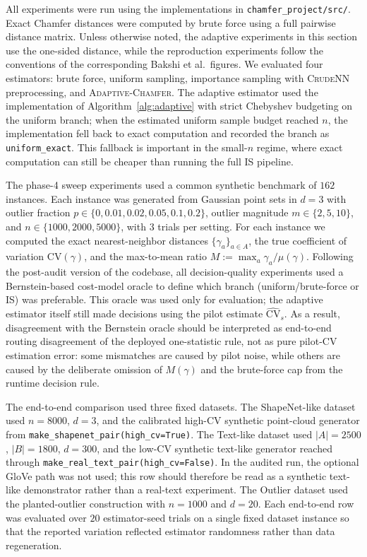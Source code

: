 \documentclass[conference]{IEEEtran}
\begin{document}
All experiments were run using the implementations in
\texttt{chamfer\_project/src/}. Exact Chamfer distances were computed
by brute force using a full pairwise distance matrix. Unless otherwise
noted, the adaptive experiments in this section use the one-sided
distance, while the reproduction experiments follow the conventions of
the corresponding Bakshi et al.\ figures. We
evaluated four estimators: brute force, uniform sampling, importance
sampling with \textsc{CrudeNN} preprocessing, and
\textsc{Adaptive-Chamfer}. The adaptive estimator used the
implementation of Algorithm~\ref{alg:adaptive} with strict Chebyshev
budgeting on the uniform branch; when the estimated uniform sample
budget reached $n$, the implementation fell back to exact computation
and recorded the branch as \texttt{uniform\_exact}. This fallback is
important in the small-$n$ regime, where exact computation can still be
cheaper than running the full IS pipeline.

The phase-4 sweep experiments used a common synthetic benchmark of
$162$ instances. Each instance was generated from Gaussian point sets in
$d=3$ with outlier fraction
$p \in \{0, 0.01, 0.02, 0.05, 0.1, 0.2\}$, outlier magnitude
$m \in \{2,5,10\}$, and
$n \in \{1000,2000,5000\}$, with $3$ trials per setting. For each
instance we computed the exact nearest-neighbor distances
$\{\gamma_a\}_{a \in A}$, the true coefficient of variation
$\mathrm{CV}(\gamma)$, and the max-to-mean ratio
$M := \max_a \gamma_a / \mu(\gamma)$. Following the post-audit version
of the codebase, all decision-quality experiments used a
Bernstein-based cost-model oracle to define which branch
(uniform/brute-force or IS) was preferable. This oracle was used only
for evaluation; the adaptive estimator itself still made decisions using
the pilot estimate $\widehat{\mathrm{CV}}_s$. As a result, disagreement
with the Bernstein oracle should be interpreted as end-to-end routing
disagreement of the deployed one-statistic rule, not as pure pilot-CV
estimation error: some mismatches are caused by pilot noise, while
others are caused by the deliberate omission of $M(\gamma)$ and the
brute-force cap from the runtime decision rule.

The end-to-end comparison used three fixed datasets. The
ShapeNet-like dataset used $n=8000$, $d=3$, and the calibrated
high-CV synthetic point-cloud generator from
\texttt{make\_shapenet\_pair(high\_cv=True)}. The Text-like dataset
used $|A|=2500$, $|B|=1800$, $d=300$, and the low-CV synthetic
text-like generator reached through
\texttt{make\_real\_text\_pair(high\_cv=False)}. In the audited run,
the optional GloVe path was not used; this row should therefore be read
as a synthetic text-like demonstrator rather than a real-text
experiment. The Outlier dataset used the planted-outlier construction
with $n=1000$ and $d=20$. Each end-to-end row was evaluated over $20$
estimator-seed trials on a single fixed dataset instance so that the
reported variation reflected estimator randomness rather than data
regeneration.
\end{document}
